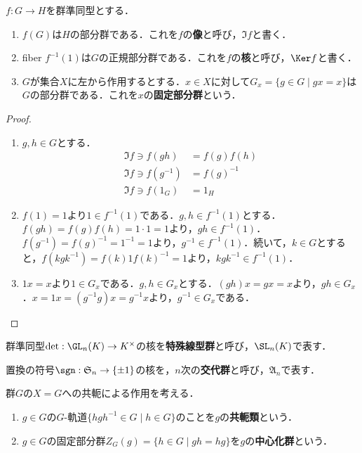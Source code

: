 \documentclass[uplatex, dvipdfmx]{jsreport}
\begin{document}
\begin{proposition}\mbox{}
    $f:G\to H$を群準同型とする．
    \begin{enumerate}
        \item $f(G)$は$H$の部分群である．これを$f$の\textbf{像}と呼び，$\Im f$と書く．
        \item fiber $f^{-1}(1)$は$G$の正規部分群である．これを$f$の\textbf{核}と呼び，$\Ker f$と書く．
        \item $G$が集合$X$に左から作用するとする．$x\in X$に対して$G_x=\{g\in G\mid gx=x\}$は$G$の部分群である．これを$x$の\textbf{固定部分群}という．
    \end{enumerate}
\end{proposition}
\begin{proof}\mbox{}
    \begin{enumerate}
        \item $g,h\in G$とする．
        \begin{align*}
            \Im f\ni f(gh)&=f(g)f(h)\\
            \Im f\ni f(g^{-1})&=f(g)^{-1}\\
            \Im f\ni f(1_G)&=1_H
        \end{align*}
        \item $f(1)=1$より$1\in f^{-1}(1)$である．$g,h\in f^{-1}(1)$とする．$f(gh)=f(g)f(h)=1\cdot 1=1$より，$gh\in f^{-1}(1)$．$f(g^{-1})=f(g)^{-1}=1^{-1}=1$より，$g^{-1}\in f^{-1}(1)$．続いて，$k\in G$とすると，$f(kgk^{-1})=f(k)1f(k)^{-1}=1$より，$kgk^{-1}\in f^{-1}(1)$．
        \item $1x=x$より$1\in G_x$である．$g,h\in G_x$とする．$(gh)x=gx=x$より，$gh\in G_x$．$x=1x=(g^{-1}g)x=g^{-1}x$より，$g^{-1}\in G_x$である．
    \end{enumerate}
\end{proof}

\begin{example}
    群準同型$\det:\GL_n(K)\to K^\times$の核を\textbf{特殊線型群}と呼び，$\SL_n(K)$で表す．
\end{example}

\begin{example}
    置換の符号$\sgn:\mathfrak{S}_n\to\{\pm 1\}$の核を，$n$次の\textbf{交代群}と呼び，$\mathfrak{A}_n$で表す．
\end{example}

\begin{example}[群の共軛類とcentralizer]群$G$の$X=G$への共軛による作用を考える．
    \begin{enumerate}
        \item $g\in G$の$G$-軌道$\{hgh^{-1}\in G\mid h\in G\}$のことを$g$の\textbf{共軛類}という．
        \item $g\in G$の固定部分群$Z_G(g)=\{h\in G\mid gh=hg\}$を$g$の\textbf{中心化群}という．
    \end{enumerate}
\end{example}
\end{document}
